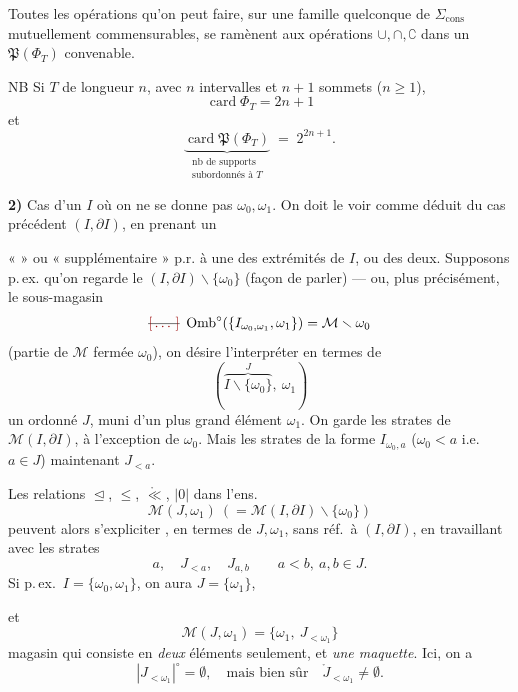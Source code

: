 \documentclass[11pt,a4paper]{article}
\begin{document}
Toutes les opérations  qu'on peut faire, sur une famille quelconque  de $\Sigma_{\mathrm{cons}}$ mutuellement commensurables, se ramènent aux opérations $\cup,\cap,\complement$ dans un $\mathfrak{P}(\Phi_T)$ convenable.

NB Si $T$ de longueur $n$, avec $n$ intervalles et $n+1$ sommets ($n\geq 1$),
\[
  \operatorname{card}\Phi_T=2n+1
\]
et
\[
  \underbrace{\operatorname{card}\mathfrak{P}(\Phi_T)}_{\substack{\text{nb de supports}\\ \text{subordonnés à } T}} \;=\; 2^{2n+1}.
\]

\textbf{2)} Cas d'un $I$ où on ne se donne pas $\omega_0,\omega_1$. On doit le voir comme déduit du cas précédent $(I,\partial I)$, en prenant un

«  » ou « supplémentaire » p.r. à une des extrémités de $I$, ou des deux. Supposons p.\,ex.  qu'on regarde le $(I,\partial I)\smallsetminus\{\omega_0\}$ (façon de parler) — ou, plus précisément, le sous-magasin
\[
  \text{\struck{\ill{}}}\ \operatorname{Omb}^{\circ}(\{I_{\omega_0,\omega_1},\omega_1\})=\mathcal{M}\smallsetminus\omega_0
\]
(partie de $\mathcal{M}$ fermée  $\omega_0$), on désire l'interpréter en termes de
\[
  (\overbrace{I\smallsetminus\{\omega_0\}}^{J},\ \omega_1)
\]
un ordonné $J$, muni d'un plus grand élément $\omega_1$. On garde  les strates de $\mathcal{M}(I,\partial I)$, à l'exception \add{\ill{}} de $\omega_0$. Mais les strates de la forme $I_{\omega_0,a}$  ($\omega_0<a$ i.e. $a\in J$) maintenant $J_{<a}$.

Les relations $\trianglelefteq$, $\leq$, $\mathring{\ll}$, $|0|$  dans l'ens.
\[
  \mathcal{M}(J,\omega_1)\ (=\mathcal{M}(I,\partial I)\smallsetminus\{\omega_0\})
\]
peuvent alors s'expliciter \struck{\ill{}} , en termes de $J,\omega_1$, sans réf.\ à $(I,\partial I)$, en travaillant avec les strates
\[
  a,\quad J_{<a},\quad J_{a,b}\qquad a<b,\ a,b\in J .
\]
Si p.\,ex.\ $I=\{\omega_0,\omega_1\}$, on aura $J=\{\omega_1\}$,

et
\[
  \mathcal{M}(J,\omega_1)=\{\omega_1,\ J_{<\omega_1}\}
\]
magasin qui consiste en \textit{deux} éléments seulement, et  \textit{une maquette}. Ici, on a
\[
  |J_{<\omega_1}|^{\circ}=\emptyset, \quad\text{mais bien sûr}\quad \mathring{J}_{<\omega_1}\neq\emptyset .
\]
\end{document}
